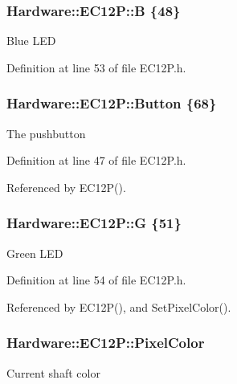 \subsubsection[{B}]{ Hardware\+::\+E\+C12\+P\+::\+B \{48\}\hspace{0.3cm}{\ttfamily [private]}}\label{class_hardware_1_1_e_c12_p_a326f00b2047ecb58ee1e7e894dc61ad3}
Blue L\+E\+D 

Definition at line 53 of file E\+C12\+P.\+h.

\hypertarget{class_hardware_1_1_e_c12_p_a6d91a7b1767f080af8c33bacdae1dd1d}{}
\subsubsection[{Button}]{ Hardware\+::\+E\+C12\+P\+::\+Button \{68\}}\label{class_hardware_1_1_e_c12_p_a6d91a7b1767f080af8c33bacdae1dd1d}
The pushbutton 

Definition at line 47 of file E\+C12\+P.\+h.



Referenced by E\+C12\+P().

\hypertarget{class_hardware_1_1_e_c12_p_a7afd63c14e12d861c8b20614ef34d70e}{}
\subsubsection[{G}]{ Hardware\+::\+E\+C12\+P\+::\+G \{51\}\hspace{0.3cm}{\ttfamily [private]}}\label{class_hardware_1_1_e_c12_p_a7afd63c14e12d861c8b20614ef34d70e}
Green L\+E\+D 

Definition at line 54 of file E\+C12\+P.\+h.



Referenced by E\+C12\+P(), and Set\+Pixel\+Color().

\hypertarget{class_hardware_1_1_e_c12_p_a1bc6223c152c6d9f30304b92069f05c0}{}
\subsubsection[{Pixel\+Color}]{ Hardware\+::\+E\+C12\+P\+::\+Pixel\+Color\hspace{0.3cm}{\ttfamily [private]}}\label{class_hardware_1_1_e_c12_p_a1bc6223c152c6d9f30304b92069f05c0}
Current shaft color 


